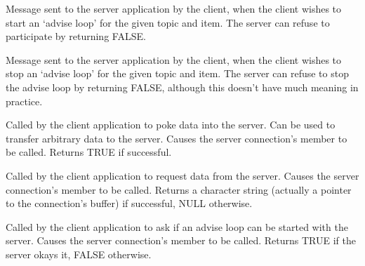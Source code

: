 \label{wxconnectiononstartadvise}


Message sent to the server application by the client, when the client
wishes to start an `advise loop' for the given topic and item. The
server can refuse to participate by returning FALSE.

\label{wxconnectiononstopadvise}


Message sent to the server application by the client, when the client
wishes to stop an `advise loop' for the given topic and item. The
server can refuse to stop the advise loop by returning FALSE, although
this doesn't have much meaning in practice.

\label{wxconnectionpoke}


Called by the client application to poke data into the server. Can be
used to transfer arbitrary data to the server. Causes the server
connection's  member
to be called. Returns TRUE if successful.

\label{wxconnectionrequest}


Called by the client application to request data from the server. Causes
the server connection's  member to be called. Returns a
character string (actually a pointer to the connection's buffer) if
successful, NULL otherwise.

\label{wxconnectionstartadvise}


Called by the client application to ask if an advise loop can be started
with the server. Causes the server connection's \rtfsp
member to be called. Returns TRUE if the server okays it, FALSE
otherwise.

